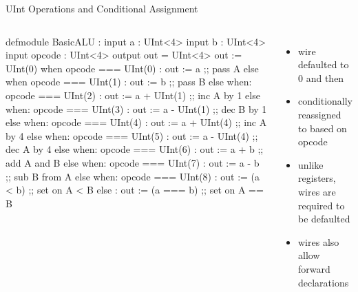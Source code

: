 \documentclass[xcolor=pdflatex,dvipsnames,table]{beamer}
\begin{document}
\begin{frame}[fragile]{UInt Operations and Conditional Assignment}

\begin{columns}

{
\begin{stanza}
defmodule BasicALU :
  input a      : UInt<4>
  input b      : UInt<4>
  input opcode : UInt<4>
  output out = UInt<4>
  out := UInt(0) 
  when opcode === UInt(0) :
    out := a                   ;; pass A
  else when opcode === UInt(1) :
    out := b                   ;; pass B
  else when: opcode === UInt(2) :
    out := a + UInt(1)         ;; inc A by 1
  else when: opcode === UInt(3) :
    out := a - UInt(1)         ;; dec B by 1
  else when: opcode === UInt(4) :
    out := a + UInt(4)         ;; inc A by 4
  else when: opcode === UInt(5) :
    out := a - UInt(4)         ;; dec A by 4
  else when: opcode === UInt(6) :
    out := a + b               ;; add A and B
  else when: opcode === UInt(7) :
    out := a - b               ;; sub B from A
  else when: opcode === UInt(8) :
    out := (a < b)             ;; set on A < B
  else :
    out := (a === b)           ;; set on A == B
\end{stanza}
}

\begin{itemize}
\item wire  defaulted to 0 and then
\item conditionally reassigned to based on opcode
\item unlike registers, wires are required to be defaulted
\item wires also allow forward declarations
\end{itemize}
\end{columns}
\end{frame}
\end{document}
